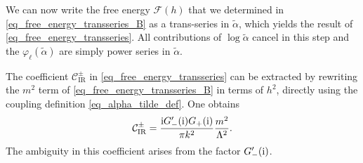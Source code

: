 \documentclass[a4paper,11pt]{article}
\theoremstyle{definition}
\newcommand{\ri}{{\rm i}}
\begin{document}
We can now write the free energy $\mathcal{F}(h)$ that we determined in \eqref{eq_free_energy_transseries_B} as a trans-series in $\tilde{\alpha}$, which yields the result of \eqref{eq_free_energy_transseries}. All contributions of $\log \tilde\alpha$ cancel in this step and the $\varphi_\ell(\tilde{\alpha})$ are simply power series in $\tilde{\alpha}$.

The coefficient $\mathcal{C}_\text{IR}^\pm$ in \eqref{eq_free_energy_transseries} can be extracted by rewriting the $m^2$ term of \eqref{eq_free_energy_transseries_B} in terms of $h^2$, directly using the coupling definition \eqref{eq_alpha_tilde_def}. One obtains
\begin{equation}
\mathcal{C}_\text{IR}^\pm = \frac{\ri G_-'(\ri) G_+(\ri)}{\pi k^2} \frac{m^2}{\Lambda^2}.
\end{equation}
The ambiguity in this coefficient arises from the factor $G_-'(\ri)$.
\end{document}
